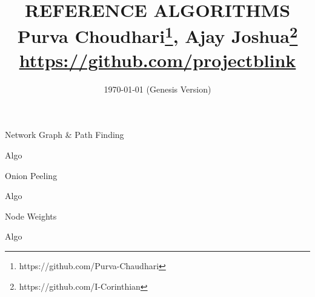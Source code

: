 \documentclass[a4paper,10pt,twocolumn]{extarticle}
\title{\vspace{-10mm} \footnotesize \textbf{REFERENCE ALGORITHMS} \vspace{3mm}\\
\scriptsize \vspace{-2mm} Purva Choudhari\thanks{https://github.com/Purva-Chaudhari}, Ajay Joshua\thanks{https://github.com/I-Corinthian} \vspace{1mm}\\
\url{https://github.com/projectblink}\vspace{-14mm}}
\date{\scriptsize \today \hspace{0.5mm} (Genesis Version) \vspace{-7mm}}
\begin{document}
\maketitle
\scriptsize
\begin{algorithm}[H]
\scriptsize
\DontPrintSemicolon
\caption{Network Graph \& Path Finding}
Algo\;
\end{algorithm}

\begin{algorithm}[H]
\scriptsize
\DontPrintSemicolon
\caption{Onion Peeling}
Algo\;
\end{algorithm}

\begin{algorithm}[H]
\scriptsize
\DontPrintSemicolon
\caption{Node Weights}
Algo\;
\end{algorithm}
\end{document}
